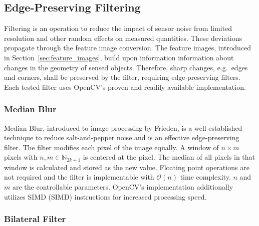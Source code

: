 \subsection{Edge-Preserving Filtering}

Filtering is an operation to reduce the impact of sensor noise from limited resolution and other random effects on measured quantities.
These deviations propagate through the feature image conversion.
The feature images, introduced in Section~\ref{sec:feature_images}, build upon information information about changes in the geometry of sensed objects.
Therefore, sharp changes, e.g.~edges and corners, shall be preserved by the filter, requiring edge-preserving filters.
Each tested filter uses OpenCV's\cite{opencv_library} proven and readily available implementation.

\subsubsection{Median Blur}

Median Blur, introduced to image processing by Frieden\cite{frieden_new76}, is a well established technique to reduce salt-and-pepper noise and is an effective edge-preserving filter.
The filter modifies each pixel of the image equally.
A window of $n \times m$ pixels with $n,m \in \mathbb{N}_{2k + 1}$ is centered at the pixel.
The median of all pixels in that window is calculated and stored as the new value.
Floating point operations are not required and the filter is implementable with $\mathcal{O}(n)$\cite{huang_ieee79} time complexity.
$n$ and $m$ are the controllable parameters.
OpenCV's\cite{opencv_library} implementation additionally utilizes \acrshort{SIMD} (\acrlong{SIMD}) instructions for increased processing speed.

\subsubsection{Bilateral Filter}

